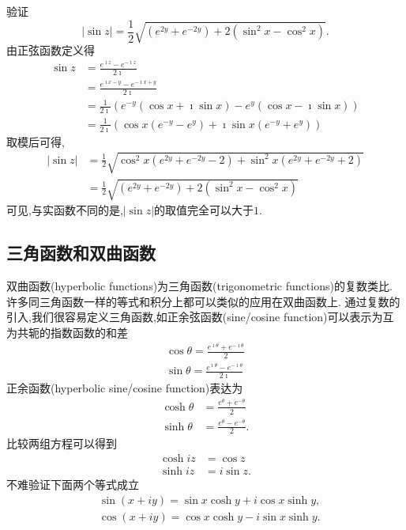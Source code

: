 \begin{examplebox}{验证\begin{equation*}
    |\sin z|=\frac{1}{2} \sqrt{\left(e^{2 y}+e^{-2 y}\right)+2\left(\sin ^2 x-\cos ^2 x\right)} .
    \end{equation*}
    }
    由正弦函数定义得
    \begin{align*}
        \sin z &= \frac{e^{\imath z} - e^{-\imath z}}{2\imath} 
        \\ 
        & = \frac{e^{\imath x - y} - e^{-\imath x + y}}{2\imath}
        \\
        & = \frac{1}{2\imath}\left( e^{-y} (\cos x + \imath \sin x ) - e^{y} (\cos x - \imath \sin x ) \right) 
        \\
        & = \frac{1}{2\imath} \left( \cos x (e^{-y} - e^{y}) + \imath \sin x (e^{-y} + e^{y}) \right)
    \end{align*}
    取模后可得,
    \begin{align*}
        |\sin z | &= \frac{1}{2}\sqrt{ \cos^2x (e^{2y} + e^{-2y} -2) + \sin^2 x (e^{2y} + e^{-2y} +2) }
        \\
        &=\frac{1}{2}\sqrt{\left(e^{2 y}+e^{-2 y}\right)+2\left(\sin ^2 x-\cos ^2 x\right)}
    \end{align*}
    可见,与实函数不同的是,$|\sin z|$的取值完全可以大于$1$.
\end{examplebox}


\subsection{三角函数和双曲函数}
双曲函数(hyperbolic functions)为三角函数(trigonometric functions)的复数类比.
许多同三角函数一样的等式和积分上都可以类似的应用在双曲函数上.
通过复数的引入,我们很容易定义三角函数,如正余弦函数(sine/cosine function)可以表示为互为共轭的指数函数的和差
\begin{align}
    \cos \theta = \frac{e^{\imath \theta} + e^{ -\imath \theta} }{2}
    \\
    \sin \theta = \frac{e^{\imath \theta} - e^{ -\imath \theta} }{2\imath}
\end{align}
正余函数(hyperbolic sine/cosine function)表达为
\begin{align}
    \cosh \theta &= \frac{e^{\theta} + e^{ - \theta} }{2}
    \\
    \sinh \theta &= \frac{e^{\theta} - e^{ - \theta} }{2} .
\end{align}
比较两组方程可以得到
\begin{align}
    \cosh iz &= \cos z
    \\
    \sinh iz &= i \sin z.
\end{align}
不难验证下面两个等式成立
\begin{equation}
    \begin{aligned}
    & \sin (x+i y)=\sin x \cosh y+i \cos x \sinh y, \\
    & \cos (x+i y)=\cos x \cosh y-i \sin x \sinh y.
    \end{aligned}
\end{equation}

